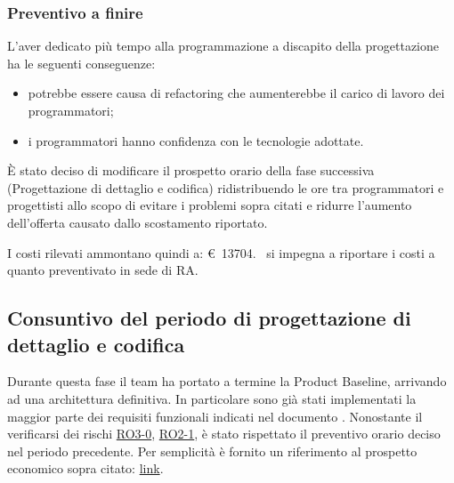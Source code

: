 \subsubsection{Preventivo a finire}
L'aver dedicato più tempo alla programmazione a discapito della progettazione ha le seguenti conseguenze:
\begin{itemize}
    \item potrebbe essere causa di refactoring che aumenterebbe il carico di lavoro dei programmatori;
    \item i programmatori hanno confidenza con le tecnologie adottate.
\end{itemize}
È stato deciso di modificare il prospetto orario della fase successiva (Progettazione di dettaglio e codifica) ridistribuendo le ore tra programmatori e progettisti allo scopo di evitare i problemi sopra citati e ridurre l'aumento dell'offerta causato dallo scostamento riportato.

\label{table:nuovo_orario_codifica}
\def\salarycontent{
    {Amministratore,22,20,440},
    {Analista,0,25,0},
    {Progettista,$80+\noexpand\textbf{10}$,22,1980},
    {Programmatore,$137-\noexpand\textbf{17}$,15,1800},
    {Responsabile,15,30,450},
    {Verificatore,82,15,1230},
    {Totale,329,127,$5935-\noexpand\textbf{35} = 5900 $ },
}


\noindent I costi rilevati ammontano quindi a: \euro\ 13704. \cod\ si impegna a riportare i costi a quanto preventivato in sede di RA.

\subsection{Consuntivo del periodo di progettazione di dettaglio e codifica}
Durante questa fase il team ha portato a termine la Product Baseline, arrivando ad una architettura definitiva.
In particolare sono già stati implementati la maggior parte dei requisiti funzionali indicati nel documento \AdR .
Nonostante il verificarsi dei rischi \hyperref[section:rischi_rilevati]{RO3-0}, \hyperref[section:rischi_rilevati]{RO2-1},
è stato rispettato il preventivo orario deciso nel periodo precedente. 
Per semplicità è fornito un riferimento al prospetto economico sopra citato: \hyperref[table:nuovo_orario_codifica]{link}.
